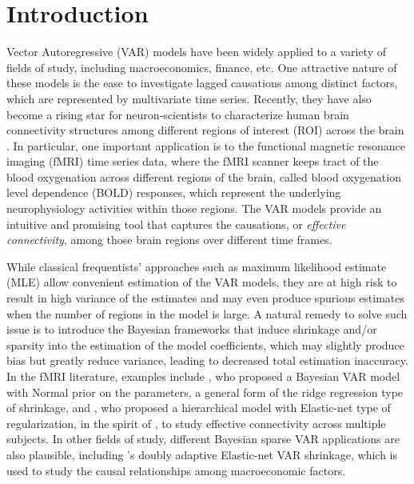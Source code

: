 \documentclass[12pt]{elsarticle}
\begin{document}
	\section{Introduction}
	Vector Autoregressive (VAR) models have been widely applied to a variety of fields of study, including macroeconomics, finance, etc. 
	One attractive nature of these models is the ease to investigate lagged causations among distinct factors, which are represented by multivariate time series.
	Recently, they have also become a rising star for neuron-scientists to characterize human brain connectivity structures among different regions of interest (ROI) across the brain \cite{Gorrostieta} \cite{Harrison}. 
	In particular, one important application is to the functional magnetic resonance imaging (fMRI) time series data, where the fMRI scanner keeps tract of the blood oxygenation across different regions of the brain, called blood oxygenation level dependence (BOLD) responses, which represent the underlying neurophysiology activities within those regions.
	The VAR models provide an intuitive and promising tool that captures the causations, or \textit{effective connectivity}, among those brain regions over different time frames. 
	
	
	While classical frequentists' approaches such as maximum likelihood estimate (MLE) allow convenient estimation of the VAR models, they are at high risk to result in high variance of the estimates and may even produce spurious estimates when the number of regions in the model is large. 
	A natural remedy to solve such issue is to introduce the Bayesian frameworks that induce shrinkage and/or sparsity into the estimation of the model coefficients, which may slightly produce bias but greatly reduce variance, leading to decreased total estimation inaccuracy.
	In the fMRI literature, examples include \cite{Harrison}, who proposed a Bayesian VAR model with Normal prior on the parameters, a general form of the ridge regression type of shrinkage, and \cite{Gorrostieta}, who proposed a hierarchical model with Elastic-net type of regularization, in the spirit of \cite{Lin}, to study effective connectivity across multiple subjects. 
	In other fields of study, different Bayesian sparse VAR applications are also plausible, including \cite{Gefang}'s doubly adaptive Elastic-net VAR shrinkage, which is used to study the causal relationships among macroeconomic factors.
	
\end{document}
